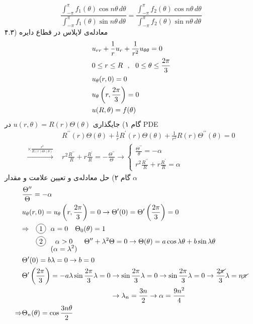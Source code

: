 \[
\frac{\int_{-\pi}^\pi f_1(\theta)\cos{n\theta}\,d\theta}{\int_{-\pi}^\pi f_1(\theta)\sin{n\theta}\,d\theta}=\frac{\int_{-\pi}^\pi f_2(\theta)\cos{n\theta}\,d\theta}{\int_{-\pi}^\pi f_2(\theta)\sin{n\theta}\,d\theta}
\]
۴.۳) معادله‌ی لاپلاس در قطاع دایره
\[\begin{aligned}
	&
	u_{rr}+\frac1ru_r+\frac1{r^2}u_{\theta\theta}=0
	\\ &
	0\le r\le R \ \ , \ \ 0\le\theta\le\frac{2\pi}3
	\\ &
	u_\theta(r,0)=0
	\\ &
	u_\theta\left(r,\frac{2\pi}3\right)=0
	\\ &
	u(R,\theta)=f(\theta)
\end{aligned}\]
گام ۱) جایگذاری
$u(r,\theta)=R(r)\Theta(\theta)$
در PDE
\[\begin{aligned}
	& R^{\prime\prime}(r)\Theta(\theta)+\frac1r R^\prime(r)\Theta(\theta)+\frac1{r^2} R(r)\Theta^{\prime\prime}(\theta)=0
	\\ \xrightarrow{\times \frac{r^2}{R(r)\Theta(\theta)}} \ \ &
	r^2\frac{R^{\prime\prime}}R+r\frac{R^\prime}{R}=-\frac{\Theta^{\prime\prime}}\Theta\rightarrow\begin{cases}
		\frac{\Theta^{\prime\prime}}\theta=-\alpha
		\\
		r^2\frac{R^{\prime\prime}}R+r\frac{R^\prime}R=\alpha
	\end{cases}
\end{aligned}\]
گام ۲) حل معادله‌ی و تعیین علامت و مقدار
$\alpha$
\[\begin{aligned}
	& \frac{\Theta^{\prime\prime}}\Theta=-\alpha
	\\ &
	u_\theta(r,0)=u_\theta\pr{r,\frac{2\pi}3}=0\rightarrow\Theta^\prime(0)=\Theta^\prime\pr{\frac{2\pi}3}=0
	\\ & \begin{aligned}
		\Rightarrow \quad & \circled1 \ \ \alpha=0 \quad \Theta_0(\theta)=1
		\\ &
		\circled2 \ \ \myunder{\alpha>0}{(\alpha=\lambda^2)} \quad \Theta^{\prime\prime}+\lambda^2\Theta=0\rightarrow\Theta(\theta)=a\cos{\lambda\theta}+b\sin{\lambda\theta}
	\end{aligned}
	\\ &
	\Theta^\prime(0)=b\lambda=0\rightarrow b=0
	\\ &
	\begin{aligned}
	\Theta^\prime\pr{\frac{2\pi}3}=-a\lambda\sin{\frac{2\pi}3\lambda}=0&\rightarrow\sin{\frac{2\pi}3\lambda}=0\rightarrow\sin{\frac{2\pi}3\lambda}=0\rightarrow\frac{2\cancel\pi}3\lambda=n\cancel\pi
	\\ &
	\rightarrow \lambda_n=\frac{3n}2\rightarrow\alpha=\frac{9n^2}4
	\end{aligned}
	\\ \Rightarrow &
	\Theta_n(\theta)=\cos\frac{3n\theta}2
\end{aligned}\]
